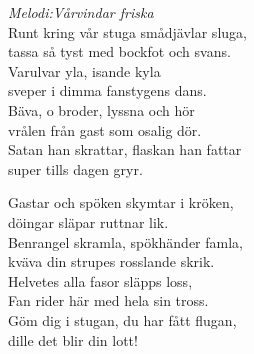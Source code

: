 {\footnotesize\textit{Melodi:Vårvindar friska}}\\
\vspace{10pt}
Runt kring vår stuga smådjävlar sluga,\\
tassa så tyst med bockfot och svans.\\
Varulvar yla, isande kyla\\
sveper i dimma fanstygens dans.\\
Bäva, o broder, lyssna och hör\\
vrålen från gast som osalig dör.\\
Satan han skrattar, flaskan han fattar\\
super tills dagen gryr.\par
\vspace{10pt}
Gastar och spöken skymtar i kröken,\\
döingar släpar ruttnar lik.\\
Benrangel skramla, spökhänder famla,\\
kväva din strupes rosslande skrik.\\
Helvetes alla fasor släpps loss,\\
Fan rider här med hela sin tross.\\
Göm dig i stugan, du har fått flugan,\\
dille det blir din lott!